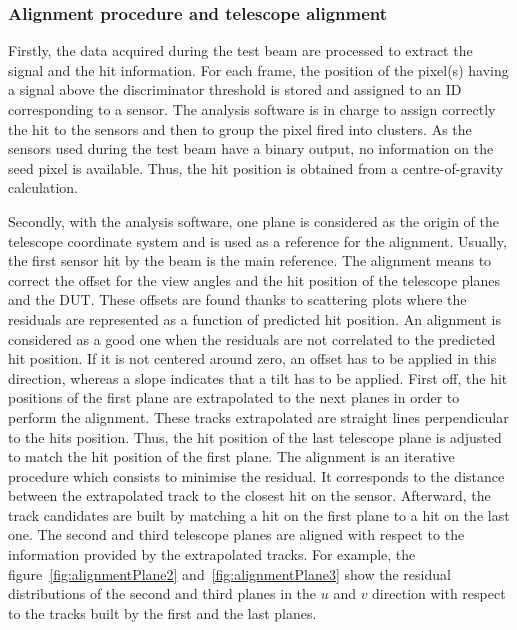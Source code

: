       \subsubsection{Alignment procedure and telescope alignment}

      Firstly, the data acquired during the test beam are processed to extract the signal and the hit information.
      For each frame, the position of the pixel(s) having a signal above the discriminator threshold is stored and assigned to an ID corresponding to a sensor.
      The analysis software is in charge to assign correctly the hit to the sensors and then to group the pixel fired into clusters.
      As the sensors used during the test beam have a binary output, no information on the seed pixel is available.
      Thus, the hit position is obtained from a centre-of-gravity calculation.

      Secondly, with the analysis software, one plane is considered as the origin of the telescope coordinate system and is used as a reference for the alignment.
      Usually, the first sensor hit by the beam is the main reference.
      The alignment means to correct the offset for the view angles and the hit position of the telescope planes and the \gls{DUT}.
      These offsets are found thanks to scattering plots where the residuals are represented as a function of predicted hit position.
      An alignment is considered as a good one when the residuals are not correlated to the predicted hit position.
      If it is not centered around zero, an offset has to be applied in this direction, whereas a slope indicates that a tilt has to be applied.
      First off, the hit positions of the first plane are extrapolated to the next planes in order to perform the alignment.
      These tracks extrapolated are straight lines perpendicular to the hits position.
      Thus, the hit position of the last telescope plane is adjusted to match the hit position of the first plane.
      The alignment is an iterative procedure which consists to minimise the residual. 
      It corresponds to the distance between the extrapolated track to the closest hit on the sensor.
      Afterward, the track candidates are built by matching a hit on the first plane to a hit on the last one.
      The second and third telescope planes are aligned with respect to the information provided by the extrapolated tracks.
      For example, the figure~\ref{fig:alignmentPlane2} and~\ref{fig:alignmentPlane3} show the residual distributions of the second and third planes in the $u$ and $v$ direction with respect to the tracks built by the first and the last planes.

